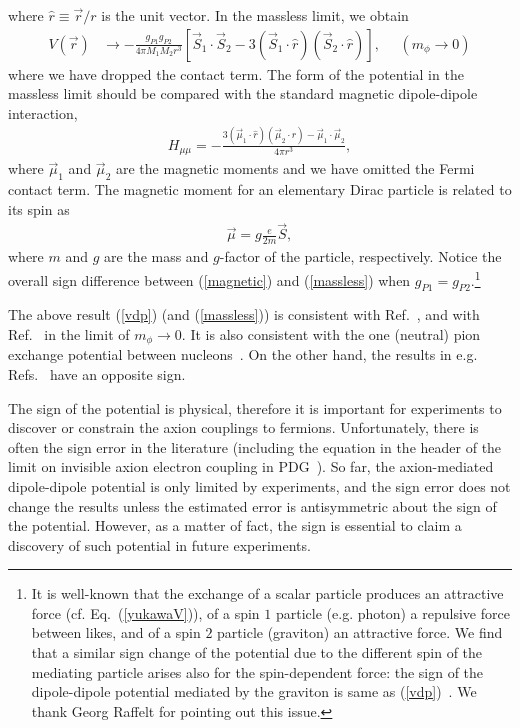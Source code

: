 \documentclass[12pt, a4paper]{article}
\begin{document}
where $\hat{r}\equiv \vec{r}/r$ is the unit vector. 
In the massless limit, we obtain
\begin{align}
\label{massless}
V(\vec{r})&\to -\frac{g_{P1}g_{P2}}{4 \pi M_1M_2 r^3 }\left[
\vec{{S}}_{1}\cdot\vec{{S}}_{2}
- 3 (\vec{{S}}_{1}\cdot\hat{r})(\vec{{S}}_{2}\cdot\hat{r})
\right],~~~~~~(m_\phi \to 0)
\end{align}
where we have dropped the contact term. The form of the potential in the massless limit 
should be compared with the standard  magnetic dipole-dipole interaction,
%
\begin{align}
\label{magnetic}
H_{\mu \mu} = - \frac{3 (\vec{\mu}_1\cdot \hat{r}) (\vec{\mu}_2\cdot \hat{r}) 
- \vec{\mu}_1 \cdot \vec{\mu}_2}{4 \pi r^3},
\end{align}
%
where $\vec{\mu}_1$ and $\vec{\mu}_2$ are the magnetic moments and we have omitted
the Fermi contact term. The magnetic moment for an elementary Dirac particle is related to 
its spin as
%
\begin{align}
\vec{\mu} = g \frac{e}{2m} \vec{{S}},
\end{align}
%
where $m$ and $g$ are the mass and $g$-factor of the particle, respectively. 
Notice the overall sign difference between (\ref{magnetic}) and  (\ref{massless}) when $g_{P1} = g_{P2}$.\footnote{
It is well-known that the exchange of a scalar particle produces an attractive force (cf. Eq.~(\ref{yukawaV})),
of a spin $1$ particle (e.g. photon) a repulsive force between likes, and of a spin $2$ particle (graviton) an attractive force. 
We find that a similar sign change of the potential due to the different spin of the mediating particle arises
also for the spin-dependent force: the sign of the dipole-dipole potential mediated
by the graviton is same as (\ref{vdp})~\cite{Holstein:2008sx}.
We thank Georg Raffelt for pointing out 
this issue.
}


The above result (\ref{vdp}) (and (\ref{massless})) is
 consistent with Ref.~\cite{Dobrescu:2006au}, and with Ref.~\cite{Anselm:1986bz} in the limit of $m_\phi\to0$. 
It is also consistent with the one (neutral) pion exchange potential between nucleons~\cite{Brueckner:1953zzb}. 
On the other hand, the results in e.g. Refs.~\cite{Anselm:1982hw,Moody:1984ba} have an opposite sign. 

The sign of the potential is physical, therefore it is important for experiments to discover or constrain 
 the axion couplings
to fermions. Unfortunately,  there is often the sign error in the literature (including the equation in the header
 of the limit on invisible axion electron coupling in PDG~\cite{Olive:2016xmw}).
 So far, the axion-mediated dipole-dipole potential is only limited by experiments, and the sign error
 does not change the results unless the estimated error is antisymmetric about the sign of the potential. 
 However, as a matter of fact, the sign is essential to claim a discovery of such potential in future experiments. 
\end{document}
